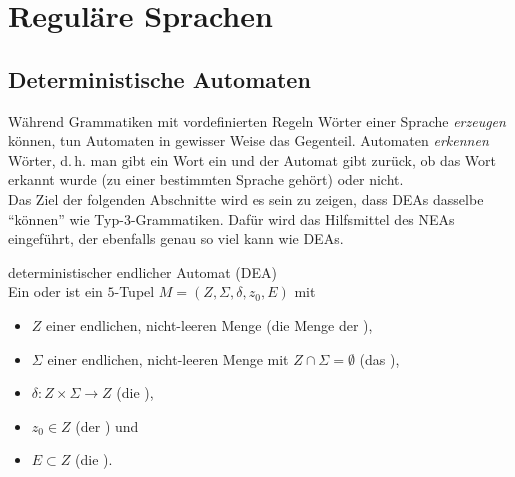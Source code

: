 \chapter{%
    Reguläre Sprachen%
}

\section{%
    Deterministische Automaten%
}

\begin{Bem}
    Während Grammatiken mit vordefinierten Regeln Wörter einer Sprache
    \emph{erzeugen} können, tun Automaten in gewisser Weise das Gegenteil.
    Automaten \emph{erkennen} Wörter, d.\,h. man gibt ein Wort ein und der
    Automat gibt zurück, ob das Wort erkannt wurde
    (zu einer bestimmten Sprache gehört) oder nicht.\\
    Das Ziel der folgenden Abschnitte wird es sein zu zeigen, dass
    DEAs dasselbe "`können"' wie Typ-3-Grammatiken.
    Dafür wird das Hilfsmittel des NEAs eingeführt, der ebenfalls genau so viel
    kann wie DEAs.
\end{Bem}

\linie

\begin{Def}{deterministischer endlicher Automat (DEA)}\\
    Ein 
    oder  ist ein $5$-Tupel $M = (Z, \Sigma, \delta, z_0, E)$ mit
    \begin{itemize}
        \item
        $Z$ einer endlichen, nicht-leeren Menge
        (die Menge der ),

        \item
        $\Sigma$ einer endlichen, nicht-leeren Menge
        mit $Z \cap \Sigma = \emptyset$
        (das ),

        \item
        $\delta\colon Z \times \Sigma \rightarrow Z$
        (die ),

        \item
        $z_0 \in Z$ (der ) und

        \item
        $E \subset Z$ (die ).
    \end{itemize}
\end{Def}

